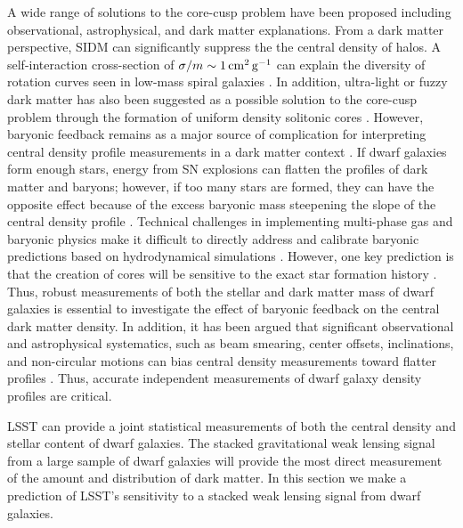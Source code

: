 A wide range of solutions to the core-cusp problem have been proposed including observational, astrophysical, and dark matter explanations.
From a dark matter perspective, SIDM can significantly suppress the the central density of halos.
A self-interaction cross-section of $\sigma / m \sim 1 \mathrm{\,cm}^2 \mathrm{\,g}^{-1}$ can explain the diversity of rotation curves seen in low-mass spiral galaxies \citep[\eg][]{1504.01437,2017PhRvL.119k1102K,Tulin:2017ara}.
In addition, ultra-light or fuzzy dark matter has also been suggested as a possible solution to the core-cusp problem through the formation of uniform density solitonic cores \citep[\eg][]{1502.03456,Hui:2017}. 
However, baryonic feedback remains as a major source of complication for interpreting central density profile measurements in a dark matter context \citep{1996MNRAS.283L..72N,2005MNRAS.356..107R,2008Sci...319..174M,2012MNRAS.421.3464P,Madau:2014,Read:2016}. 
If dwarf galaxies form enough stars, energy from SN explosions can flatten the profiles of dark matter and baryons; however, if too many stars are formed, they can have the opposite effect because of the excess baryonic mass steepening the slope of the central density profile \citep{Bullock:2017}.
Technical challenges in implementing multi-phase gas and baryonic physics make it difficult to directly address and calibrate baryonic predictions based on hydrodynamical simulations \citep{Tollet:2016,1611.02281,Sawala:2016}.
However, one key prediction is that the creation of cores will be sensitive to the exact star formation history \citep[\eg][]{governato2012,dicintio2014,onorbe2015,Read:2016,read2018,1811.11768,2019MNRAS.tmp....3R}.
Thus, robust measurements of both the stellar and dark matter mass of dwarf galaxies is essential to investigate the effect of baryonic feedback on the central dark matter density.
In addition, it has been argued that significant observational and astrophysical systematics, such as beam smearing, center offsets, inclinations, and non-circular motions can bias central density measurements toward flatter profiles \citep[\eg][]{astro-ph/0006048,2004ApJ...617.1059R,2008AJ....136.2761O,2016MNRAS.462.3628R}. 
Thus, accurate independent measurements of dwarf galaxy density profiles are critical.

LSST can provide a joint statistical measurements of both the central density and stellar content of dwarf galaxies. 
The stacked gravitational weak lensing signal from a large sample of dwarf galaxies will provide the most direct measurement of the amount and distribution of dark matter.  
In this section we make a prediction of LSST's sensitivity to a stacked weak lensing signal from dwarf galaxies.

